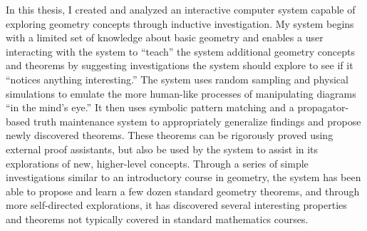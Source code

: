 %
%
%
In this thesis, I created and analyzed an interactive computer system
capable of exploring geometry concepts through inductive
investigation.  My system begins with a limited set of knowledge about
basic geometry and enables a user interacting with the system to
``teach'' the system additional geometry concepts and theorems by
suggesting investigations the system should explore to see if it
``notices anything interesting.''  The system uses random sampling and
physical simulations to emulate the more human-like processes of
manipulating diagrams ``in the mind's eye.'' It then uses symbolic
pattern matching and a propagator-based truth maintenance system to
appropriately generalize findings and propose newly discovered
theorems. These theorems can be rigorously proved using external proof
assistants, but also be used by the system to assist in its
explorations of new, higher-level concepts. Through a series of simple
investigations similar to an introductory course in geometry, the
system has been able to propose and learn a few dozen standard
geometry theorems, and through more self-directed explorations, it has
discovered several interesting properties and theorems not typically
covered in standard mathematics courses.
